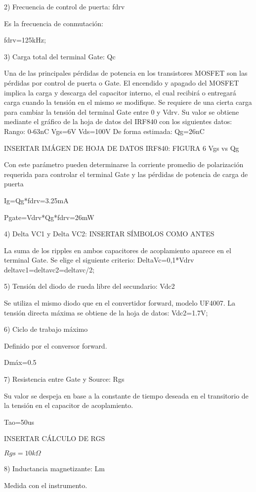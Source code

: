 2) Frecuencia de control de puerta: fdrv

Es la frecuencia de conmutación: 

fdrv=125kHz;

3) Carga total del terminal Gate: Qc

Una de las principales pérdidas de potencia en los transistores MOSFET son las pérdidas por control de puerta o Gate. 
El encendido y apagado del MOSFET implica la carga y descarga del capacitor interno, 
el cual recibirá o entregará carga cuando la tensión en el mismo se modifique. 
Se requiere de una cierta carga para cambiar la tensión del terminal Gate entre 0 y Vdrv. 
Su valor se obtiene mediante el gráfico de la hoja de datos del IRF840 con los siguientes datos:
Rango: 0-63nC
Vgs=6V
Vds=100V
De forma estimada: 
Qg=26nC

INSERTAR IMÁGEN DE HOJA DE DATOS IRF840: FIGURA 6 Vgs vs Qg

Con este parámetro pueden determinarse la corriente promedio de polarización requerida para controlar el terminal Gate 
y las pérdidas de potencia de carga de puerta

Ig=Qg*fdrv=3.25mA

Pgate=Vdrv*Qg*fdrv=26mW

4) Delta VC1 y Delta VC2: INSERTAR SÍMBOLOS COMO ANTES

La suma de los ripples en ambos capacitores de acoplamiento aparece en el terminal Gate. 
Se elige el siguiente criterio:
DeltaVc=0,1*Vdrv
deltavc1=deltavc2=deltavc/2;

5) Tensión del diodo de rueda libre del secundario: Vdc2

Se utiliza el mismo diodo que en el convertidor forward, modelo UF4007. 
La tensión directa máxima se obtiene de la hoja de datos: 
Vdc2=1.7V;

6) Ciclo de trabajo máximo 

Definido por el conversor forward.

Dmáx=0.5

7) Resistencia entre Gate y Source: Rgs

Su valor se despeja en base a la constante de tiempo deseada en el transitorio de la tensión en el capacitor de acoplamiento.

Tao=50us

INSERTAR CÁLCULO DE RGS

$Rgs=10k\Omega$

8) Inductancia magnetizante: Lm

Medida con el instrumento. 

